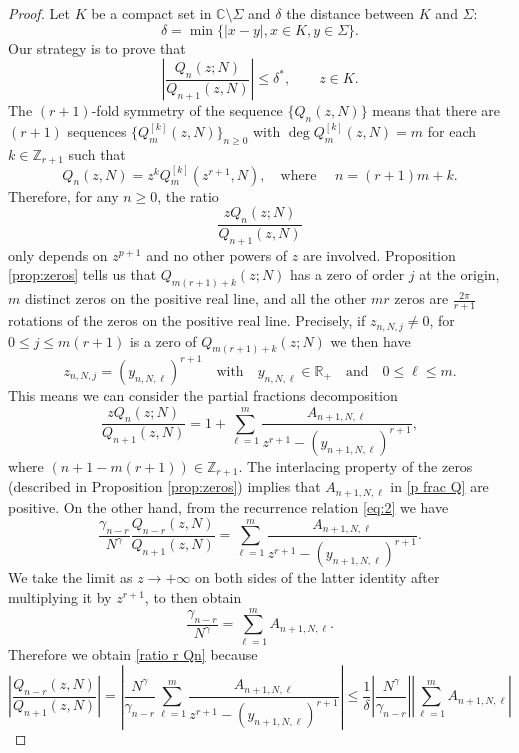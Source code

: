 \documentclass[12pt]{article}
\numberwithin{equation}{section}
\begin{document}
\begin{proof}  
Let $K$ be a compact set in $\mathbb{C} \setminus \Sigma$ and $\delta$ the distance between $K$ and $\Sigma$:
\[   \delta = \min  \{ |x-y|, x \in K, y \in \Sigma \}.  \] 
Our strategy is to prove that 
\[  
 \left| \frac{Q_n(z;N)}{Q_{n+1}(z,N)} \right| \leq \delta^* , \qquad z \in K.  
\] 
The $(r+1)$-fold symmetry of the sequence $\{Q_n(z,N)\}$ means that there are $(r+1)$ sequences $\{Q_m^{[k]}(z,N)\}_{n\geq0}$ with $\deg Q_m^{[k]}(z,N) =m$ for each $k\in\mathbb{Z}_{r+1}$ such that 
\[
	Q_n(z,N) = z^k Q_m^{[k]}(z^{r+1},N), \quad \text{where } \quad n=(r+1)m+k. 
\]
Therefore, for any $n\geq 0$, the ratio 
\[ \frac{ z Q_n(z;N)}{Q_{n+1}(z,N)}\] 
only depends on $z^{p+1}$ and no other powers of $z$ are involved. Proposition \ref{prop:zeros} tells us that $Q_{m(r+1)+k}(z;N)$ has a zero of order $j$ at the origin, $m$ distinct zeros on the positive real line, and all the other $mr$ zeros are $\frac{2\pi}{r+1}$ rotations of the zeros on the positive real line. Precisely, if $z_{n,N,j}\neq 0$, for $0\leq j \leq m(r+1)$ is a zero of $Q_{m(r+1)+k}(z;N)$ we then have 
\[
	z_{n,N,j} = (y_{n,N,\ell})^{r+1} \quad \text{with} \quad   y_{n,N,\ell}\in \mathbb{R}_+ 
	\quad \text{and} \quad  0\leq \ell \leq m.
\]
This means we can consider the  partial fractions decomposition 
\begin{equation}\label{p frac Q}
	  \frac{ z Q_n(z;N)}{Q_{n+1}(z,N)} 
	  = 1+\sum_{\ell=1}^m \frac{A_{n+1,N,\ell}}{z^{r+1}-\left(y_{n+1,N,\ell}\right)^{r+1}}  ,  
\end{equation}
where $(n+1-m(r+1)) \in\mathbb{Z}_{r+1}$. The interlacing property of the zeros (described in Proposition  \ref{prop:zeros}) implies that $A_{n+1,N,\ell}$ in \eqref{p frac Q} are positive. On the other hand, from the recurrence relation \eqref{eq:2} we have 
\[
	 \frac{\gamma_{n-r}}{N^\gamma} \frac{Q_{n-r}(z,N)}{Q_{n+1}(z,N)}  
	 =  \sum_{\ell=1}^m \frac{A_{n+1,N,\ell}}{z^{r+1}-\left(y_{n+1,N,\ell}\right)^{r+1}} . 
\]
We take the limit as $z\to+\infty $ on both sides of the latter identity after multiplying it by $z^{r+1}$, to then obtain 
\begin{equation}\label{ident sum As}
 	 \frac{\gamma_{n-r}}{N^\gamma}	 =  \sum_{\ell=1}^m A_{n+1,N,\ell} . 
\end{equation}
Therefore we obtain \eqref{ratio r Qn} because 
\[
	\left|\frac{Q_{n-r}(z,N)}{Q_{n+1}(z,N)}  \right|
	=\left|  \frac{N^\gamma} {\gamma_{n-r}}  \sum_{\ell=1}^m \frac{A_{n+1,N,\ell}}{z^{r+1}-\left(y_{n+1,N,\ell}\right)^{r+1}} \right|
	\leq \frac{1}{\delta}  \left| \frac{N^\gamma} {\gamma_{n-r}} \right|  \left| \sum_{\ell=1}^m A_{n+1,N,\ell} \right|
\]
\end{proof}
\end{document}
